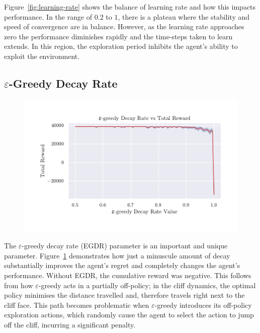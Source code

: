 \documentclass[]{final_report}
\begin{document}
\newpage
Figure~\ref {fig:learning-rate} shows the balance of learning rate and how this impacts performance. In the range of $0.2$ to $1$, there is a plateau where the stability and speed of convergence are in balance. However, as the learning rate approaches zero the performance diminishes rapidly and the time-steps taken to learn extends. In this region, the exploration period inhibits the agent's ability to exploit the environment.

\subsection{\texorpdfstring{$\varepsilon$}{Lg}-Greedy Decay Rate}\label{edgr-section}

\begin{figure}[H]
  \centering
  
  \includegraphics[trim={0 1cm 0 1cm},clip,width=\textwidth]{hyper-paramiters/epsilon-greedy-decay-full}
  
  \caption{\label{fig:epsilon-greedy-decay-full}}
\end{figure}

The $\varepsilon$-greedy decay rate (EGDR) parameter is an important and unique parameter. Figure~\ref{fig:epsilon-greedy-decay-full} demonstrates how just a minuscule amount of decay substantially improves the agent's regret and completely changes the agent's performance. Without EGDR, the cumulative reward was negative. This follows from how $\varepsilon$-greedy acts in a partially off-policy; in the cliff dynamics, the optimal policy minimises the distance travelled and, therefore travels right next to the cliff face. This path becomes problematic when $\varepsilon$-greedy introduces its off-policy exploration actions, which randomly cause the agent to select the action to jump off the cliff, incurring a significant penalty.
\end{document}
